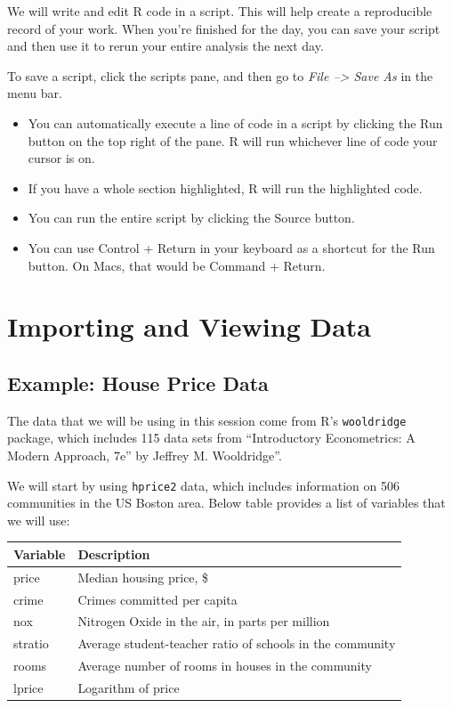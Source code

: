 \documentclass[
  letterpaper,
  DIV=11,
  numbers=noendperiod]{scrreprt}
\begin{document}
We will write and edit R code in a script. This will help create a
reproducible record of your work. When you're finished for the day, you
can save your script and then use it to rerun your entire analysis the
next day.

To save a script, click the scripts pane, and then go to \emph{File
--\textgreater{} Save As} in the menu bar.

\begin{itemize}
\item
  You can automatically execute a line of code in a script by clicking
  the Run button on the top right of the pane. R will run whichever line
  of code your cursor is on.
\item
  If you have a whole section highlighted, R will run the highlighted
  code.
\item
  You can run the entire script by clicking the Source button.
\item
  You can use Control + Return in your keyboard as a shortcut for the
  Run button. On Macs, that would be Command + Return.
\end{itemize}

\chapter{Importing and Viewing Data}\label{importing-and-viewing-data}

\section{Example: House Price Data}\label{example-house-price-data}

The data that we will be using in this session come from R's
\texttt{wooldridge} package, which includes 115 data sets from
``Introductory Econometrics: A Modern Approach, 7e'' by Jeffrey M.
Wooldridge''.

We will start by using \texttt{hprice2} data, which includes information
on 506 communities in the US Boston area. Below table provides a list of
variables that we will use:

\begin{longtable}[]{@{}ll@{}}
\toprule\noalign{}
Variable & Description \\
\midrule\noalign{}
\endhead
\bottomrule\noalign{}
\endlastfoot
price & Median housing price, \$ \\
crime & Crimes committed per capita \\
nox & Nitrogen Oxide in the air, in parts per million \\
stratio & Average student-teacher ratio of schools in the community \\
rooms & Average number of rooms in houses in the community \\
lprice & Logarithm of price \\
\end{longtable}
\end{document}
